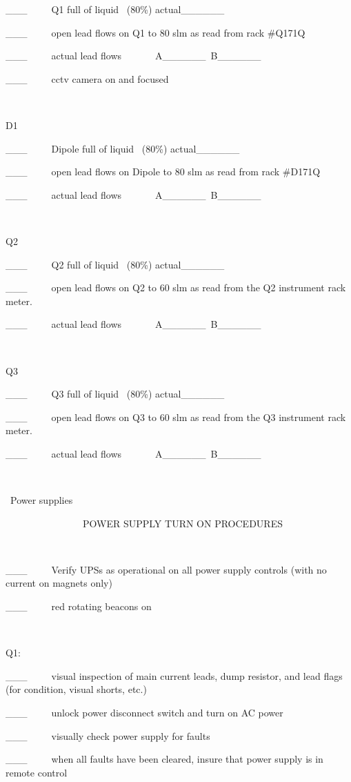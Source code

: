 \_\_\_~~~~~Q1 full of liquid~ (80\%) actual\_\_\_\_\_\_

\_\_\_~~~~~open lead flows on Q1 to 80 slm as read from rack \#Q171Q

\_\_\_~~~~~actual lead flows~~~~~~~A\_\_\_\_\_\_~B\_\_\_\_\_\_

\_\_\_~~~~~cctv camera on and focused

~

D1

\_\_\_~~~~~Dipole full of liquid~ (80\%) actual\_\_\_\_\_\_

\_\_\_~~~~~open lead flows on Dipole to 80 slm as read from rack \#D171Q

\_\_\_~~~~~actual lead flows~~~~~~~A\_\_\_\_\_\_~B\_\_\_\_\_\_

~

Q2

\_\_\_~~~~~Q2 full of liquid~ (80\%) actual\_\_\_\_\_\_

\_\_\_~~~~~open lead flows on Q2 to 60 slm as read from the Q2 instrument rack
meter.

\_\_\_~~~~~actual lead flows~~~~~~~A\_\_\_\_\_\_~B\_\_\_\_\_\_

~

Q3

\_\_\_~~~~~Q3 full of liquid~ (80\%) actual\_\_\_\_\_\_

\_\_\_~~~~~open lead flows on Q3 to 60 slm as read from the Q3 instrument rack
meter.

\_\_\_~~~~~actual lead flows~~~~~~~A\_\_\_\_\_\_~B\_\_\_\_\_\_

~

~Power supplies

~~~~~~~~~~~~~~~~POWER SUPPLY TURN ON PROCEDURES

~

\_\_\_~~~~~Verify UPSs as operational on all power supply controls (with no
current on magnets only)

\_\_\_~~~~~red rotating beacons on 

~

Q1:~~~~~

\_\_\_~~~~~visual inspection of main current leads, dump resistor, and lead
flags (for condition, visual shorts, etc.)

\_\_\_~~~~~unlock power disconnect switch and turn on AC power

\_\_\_~~~~~visually check power supply for faults

\_\_\_~~~~~when all faults have been cleared, insure that power supply is in
remote control

